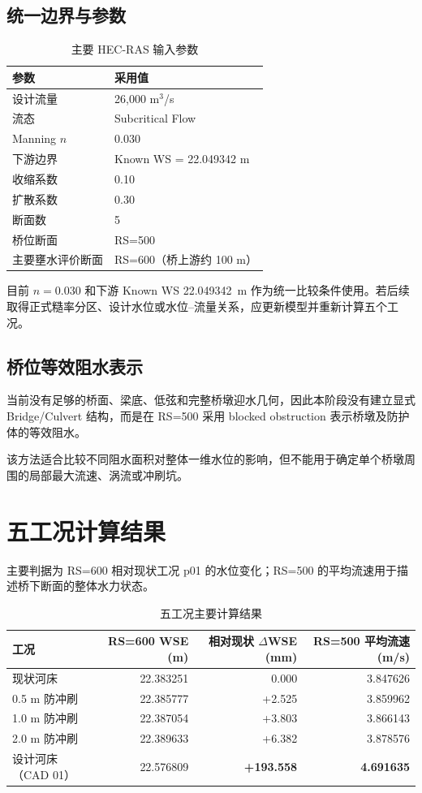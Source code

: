 \documentclass[UTF8,a4paper,12pt]{ctexart}
\begin{document}
\subsection{统一边界与参数}
\begin{table}[H]
\centering
\caption{主要 HEC-RAS 输入参数}
\begin{tabular}{ll}
\toprule
参数 & 采用值 \\
\midrule
设计流量 & 26,000 m$^3$/s \\
流态 & Subcritical Flow \\
Manning $n$ & 0.030 \\
下游边界 & Known WS = 22.049342 m \\
收缩系数 & 0.10 \\
扩散系数 & 0.30 \\
断面数 & 5 \\
桥位断面 & RS=500 \\
主要壅水评价断面 & RS=600（桥上游约 100 m） \\
\bottomrule
\end{tabular}
\end{table}

目前 $n=0.030$ 和下游 Known WS 22.049342~m 作为统一比较条件使用。若后续取得正式糙率分区、设计水位或水位--流量关系，应更新模型并重新计算五个工况。

\subsection{桥位等效阻水表示}
当前没有足够的桥面、梁底、低弦和完整桥墩迎水几何，因此本阶段没有建立显式 Bridge/Culvert 结构，而是在 RS=500 采用 blocked obstruction 表示桥墩及防护体的等效阻水。

该方法适合比较不同阻水面积对整体一维水位的影响，但不能用于确定单个桥墩周围的局部最大流速、涡流或冲刷坑。

\section{五工况计算结果}
主要判据为 RS=600 相对现状工况 p01 的水位变化；RS=500 的平均流速用于描述桥下断面的整体水力状态。

\begin{table}[H]
\centering
\caption{五工况主要计算结果}
\begin{tabular}{lrrr}
\toprule
工况 & RS=600 WSE (m) & 相对现状 $\Delta$WSE (mm) & RS=500 平均流速 (m/s) \\
\midrule
现状河床 & 22.383251 & 0.000 & 3.847626 \\
0.5 m 防冲刷 & 22.385777 & +2.525 & 3.859962 \\
1.0 m 防冲刷 & 22.387054 & +3.803 & 3.866143 \\
2.0 m 防冲刷 & 22.389633 & +6.382 & 3.878576 \\
设计河床（CAD 01） & 22.576809 & \textbf{+193.558} & \textbf{4.691635} \\
\bottomrule
\end{tabular}
\end{table}
\end{document}
